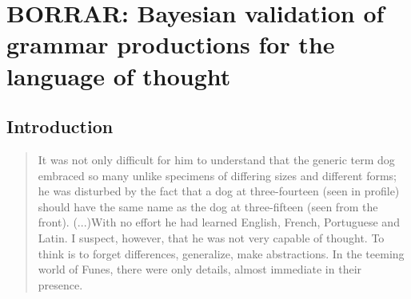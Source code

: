 

\chapter{BORRAR: Bayesian validation of grammar productions for the language of thought}

\section{Introduction}
\blockquote{It was not only difficult for him to understand that the generic term dog embraced so many unlike specimens of differing sizes and different forms; he was disturbed by the fact that a dog at three-fourteen (seen in profile) should have the same name as the dog at three-fifteen (seen from the front). (...)With no effort he had learned English, French, Portuguese and Latin. I suspect, however, that he was not very capable of thought. To think is to forget differences, generalize, make abstractions. In the teeming world of Funes, there were only details, almost immediate in their presence. \cite{funes}}


